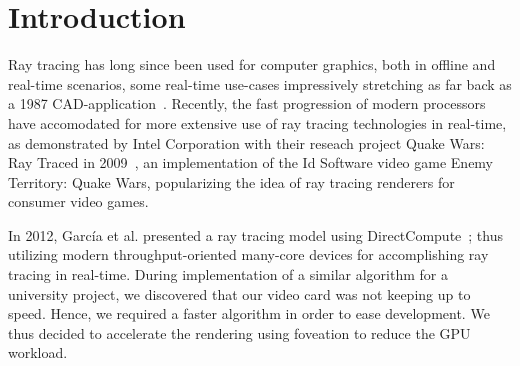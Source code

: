 \section{Introduction}

Ray tracing has long since been used for computer graphics, both in offline and real-time scenarios, some real-time use-cases impressively stretching as far back as a 1987 CAD-application~\cite{stay87}.
Recently, the fast progression of modern processors have accomodated for more extensive use of ray tracing technologies in real-time, as demonstrated by Intel Corporation with their reseach project Quake Wars: Ray Traced in 2009~\cite{pohl09}, an implementation of the Id Software video game Enemy Territory: Quake Wars, popularizing the idea of ray tracing renderers for consumer video games.

In 2012, Garc\'ia et al. presented a ray tracing model using DirectCompute~\cite{garcia12}; thus utilizing modern throughput-oriented many-core devices for accomplishing ray tracing in real-time.
During implementation of a similar algorithm for a university project, we discovered that our video card was not keeping up to speed.
Hence, we required a faster algorithm in order to ease development.
We thus decided to accelerate the rendering using foveation to reduce the GPU workload.
